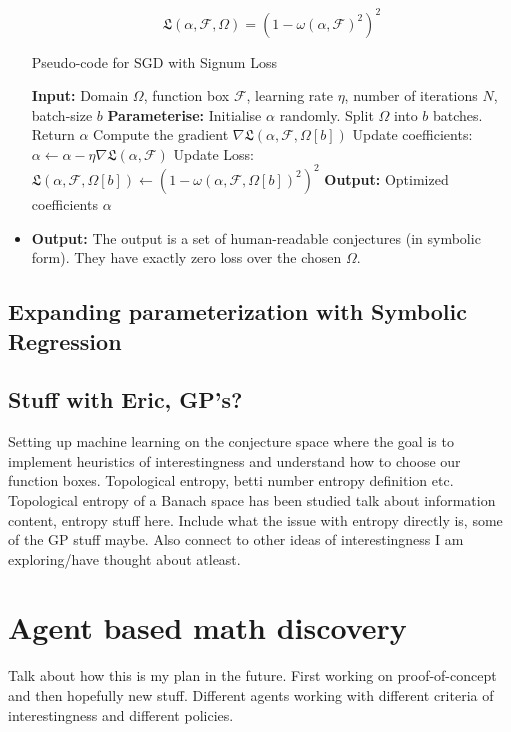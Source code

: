 \begin{itemize}
\begin{definition}
\begin{equation*}
                \mathfrak{L}(\alpha,\mathcal{F}, \Omega) = (1 - \omega(\alpha, \mathcal{F})^2)^2
            \end{equation*}
        \end{definition}
        \begin{algorithm}
        \caption{Pseudo-code for SGD with Signum Loss}\label{alg:SGD}
        \begin{algorithmic}
        \State \textbf{Input:} Domain $\Omega$, function box $\mathcal{F}$, learning rate $\eta$, number of iterations $N$, batch-size $b$
        \State \textbf{Parameterise:} Initialise $\alpha$ randomly. Split $\Omega$ into $b$ batches.
                    \State Return $\alpha$
                \EndIf
                \State Compute the gradient $\nabla\mathfrak{L}(\alpha, \mathcal{F}, \Omega[b])$ 
                \State Update coefficients: $\alpha \gets \alpha - \eta \nabla\mathfrak{L}(\alpha, \mathcal{F})$
                \State Update Loss: $\mathfrak{L}(\alpha, \mathcal{F}, \Omega[b]) \gets (1 - \omega(\alpha, \mathcal{F}, \Omega[b])^2)^2$
            \EndFor
        \EndFor
        \State \textbf{Output:} Optimized coefficients $\alpha$
        \end{algorithmic}
        \end{algorithm}   
    \item 
        \textbf{Output:} The output is a set of human-readable conjectures (in symbolic form). They have exactly zero loss over the chosen $\Omega$.
    
\end{itemize}
 

\subsection{Expanding parameterization with Symbolic Regression}
\subsection{Stuff with Eric, GP's?}
Setting up machine learning on the conjecture space where the goal is to implement heuristics of interestingness and understand how to choose our function boxes.
Topological entropy, betti number entropy definition etc. Topological entropy of a Banach space has been studied \cite{bobokTopologicalEntropyBanach2011}
talk about information content, entropy stuff here. Include what the issue with entropy directly is, some of the GP stuff maybe. Also connect to other ideas of interestingness I am exploring/have thought about atleast.

\section{Agent based math discovery}
Talk about how this is my plan in the future. First working on proof-of-concept and then hopefully new stuff.
Different agents working with different criteria of interestingness and different policies.
